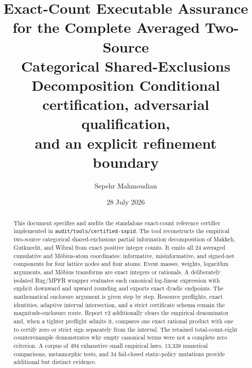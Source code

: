 \documentclass[11pt]{article}
\title{\PidReportTitle
  {Exact-Count Executable Assurance\\for the Complete Averaged Two-Source\\
   Categorical Shared-Exclusions Decomposition}
  {Conditional certification, adversarial qualification,\\
   and an explicit refinement boundary}}
\author{Sepehr Mahmoudian}
\date{28 July 2026}
\theoremstyle{definition}
\begin{document}
\PidMakeTitle

\begin{abstract}
This document specifies and audits the standalone exact-count reference certifier implemented in
\texttt{audit/tools/certified-sxpid}.  The tool reconstructs the empirical two-source categorical
shared-exclusions partial information decomposition of Makkeh, Gutknecht, and
Wibral from exact positive integer counts.  It emits all 24 averaged cumulative and
M{\"o}bius-atom coordinates: informative, misinformative, and signed-net components for four
lattice nodes and four atoms.  Event masses, weights, logarithm arguments, and M{\"o}bius
transforms are exact integers or rationals.  A deliberately isolated Rug/MPFR wrapper evaluates
each canonical log-linear expression with explicit downward and upward rounding and exports exact
dyadic endpoints.  The mathematical enclosure argument is given step by step.  Resource
preflights, exact identities, adaptive interval intersection, and a strict certificate schema
remain the magnitude-enclosure route.  Report v2 additionally clears the empirical denominator
and, when a tighter preflight admits it, compares one exact rational product with one to certify
zero or strict sign separately from the interval.  The retained total-count-eight counterexample
demonstrates why empty canonical terms were not a complete zero criterion.  A corpus of 494
exhaustive small empirical laws, 13,338 numerical comparisons, metamorphic tests, and 34
fail-closed static-policy mutations provide additional but distinct evidence.


\end{abstract}
\end{document}

